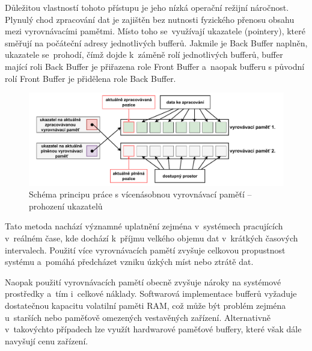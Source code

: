 Důležitou vlastností tohoto přístupu je jeho nízká operační režijní náročnost. Plynulý chod zpracování dat je zajištěn bez nutnosti fyzického přenosu obsahu mezi vyrovnávacími pamětmi. Místo toho se~využívají ukazatele (pointery), které směřují na počáteční adresy jednotlivých bufferů. Jakmile je Back Buffer naplněn, ukazatele se~prohodí, čímž dojde k~záměně rolí jednotlivých bufferů, buffer mající roli Back Buffer je přiřazena role Front Buffer a~naopak bufferu s původní rolí Front Buffer je přidělena role Back Buffer.~\cite{buffering_chang, multiple_buffering_batch_saving, double_buffering_model}

\begin{figure}[h]
    \centering
    \includegraphics[width=1.00\textwidth]{obrazky-figures/multiple_buffering-2.pdf}
    
    \caption{Schéma principu práce s vícenásobnou vyrovnávací paměťí -- prohození ukazatelů}
    \label{fig:multiple-buffering-2}
\end{figure}

\newpage

Tato metoda nachází významné uplatnění zejména v~systémech pracujících v~reálném čase, kde dochází k~příjmu velkého objemu dat v~krátkých časových intervalech. Použití více vyrovnávacích pamětí zvyšuje celkovou propustnost systému a~pomáhá předcházet vzniku úzkých míst nebo ztrátě dat. ~\cite{buffering_chang, multiple_buffering_batch_saving, double_buffering_model}

Naopak použití vyrovnávacích pamětí obecně zvyšuje nároky na systémové prostředky a~tím i~celkové náklady. Softwarová implementace bufferů vyžaduje dostatečnou kapacitu volatilní paměti RAM, což může být problém zejména u~starších nebo paměťově omezených vestavěných zařízení. Alternativně v~takovýchto případech lze využít hardwarové paměťové buffery, které však dále navyšují cenu zařízení.~\cite{buffering_chang, multiple_buffering_batch_saving, double_buffering_model}

